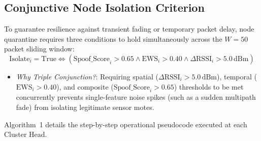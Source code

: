 \documentclass[conference]{IEEEtran}
\begin{document}
\subsection{Conjunctive Node Isolation Criterion}
To guarantee resilience against transient fading or temporary packet delay, node quarantine requires three conditions to hold simultaneously across the $W=50$ packet sliding window:
\begin{equation}
\label{eq_isolation_rule}
\text{Isolate}_i = \text{True} \iff \left( \text{Spoof\_Score}_i > 0.65 \land \text{EWS}_i > 0.40 \land \Delta\text{RSSI}_i > 5.0\,\text{dBm} \right)
\end{equation}
\begin{itemize}
    \item \textit{Why Triple Conjunction?}: Requiring spatial ($\Delta\text{RSSI}_i > 5.0\,\text{dBm}$), temporal ($\text{EWS}_i > 0.40$), and composite ($\text{Spoof\_Score}_i > 0.65$) thresholds to be met concurrently prevents single-feature noise spikes (such as a sudden multipath fade) from isolating legitimate sensor motes.
\end{itemize}

Algorithm~1 details the step-by-step operational pseudocode executed at each Cluster Head.
\end{document}
